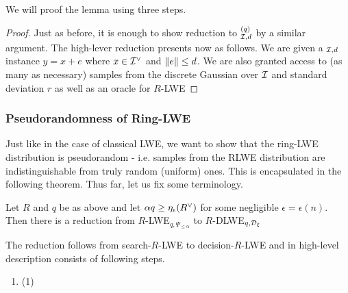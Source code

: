 We will proof the lemma using three steps.
\begin{proof}
	Just as before, it is enough to show reduction to $^{(q)}_{\mathcal{I},d}$ by a similar argument. The high-lever reduction presents now as follows. We are given a $_{\mathcal{I}, d}$ instance $y = x + e$ where $x \in \mathcal{I}^{\vee}$ and $\norm{e} \leq d$. We are also granted access to (as many as necessary) samples from the discrete Gaussian over $\mathcal{I}$ and standard deviation $r$ as well as an oracle for $R$-LWE 
\end{proof}
\subsubsection{Pseudorandomness of Ring-LWE}\label{pseudo-rlwe}
Just like in the case of classical LWE, we want to show that the ring-LWE distribution is pseudorandom - i.e. samples from the RLWE distribution are indistinguishable from truly random (uniform) ones. This is encapsulated in the following theorem. Thus far, let us fix some terminology. 
\begin{theorem}
	Let $R$ and $q$ be as above and let $\alpha q \geq \eta_{\epsilon}(R^{\vee})$ for some negligible $\epsilon = \epsilon(n)$. Then there is a reduction from $R$-LWE$_{q,\Psi_{\leq \alpha}}$ to $R$-DLWE$_{q,\mathcal{D}_{\xi}}$
\end{theorem}
The reduction follows from search-$R$-LWE to decision-$R$-LWE and in high-level description consists of following steps.\\
\begin{enumerate}
	\item (1)
\end{enumerate}

\begin{centering}
\end{centering}


